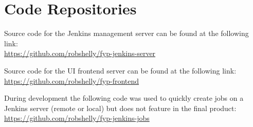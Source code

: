 \section{Code Repositories}

Source code for the Jenkins management server can be found at the following link: \\
\href{https://github.com/robshelly/fyp-jenkins-server}{https://github.com/robshelly/fyp-jenkins-server}

\medskip

\noindent Source code for the UI frontend server can be found at the following link: \\
\href{https://github.com/robshelly/fyp-frontend}{https://github.com/robshelly/fyp-frontend}

\medskip

\noindent During development the following code was used to quickly create jobs on a Jenkins server (remote or local) but does not feature in the final product: \\
\href{https://github.com/robshelly/fyp-jenkins-jobs}{https://github.com/robshelly/fyp-jenkins-jobs}
